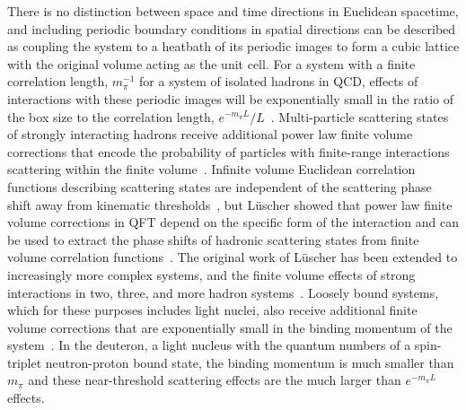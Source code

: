 There is no distinction between space and time directions in Euclidean spacetime, and including periodic boundary conditions in spatial directions can be described as coupling the system to a heatbath of its periodic images to form a cubic lattice with the original volume acting as the unit cell.
For a system with a finite correlation length, $m_{\pi}^{-1}$ for a system of isolated hadrons in QCD, effects of interactions with these periodic images will be exponentially small in the ratio of the box size to the correlation length, $e^{-m_\pi L}/L$~\cite{Luscher:1985dn}.
Multi-particle scattering states of strongly interacting hadrons receive additional power law finite volume corrections that encode the probability of particles with finite-range interactions scattering within the finite volume~\cite{Huang:1957im,Luscher:1986pf}.
Infinite volume Euclidean correlation functions describing scattering states are independent of the scattering phase shift away from kinematic thresholds~\cite{Maiani:1990ca}, but
L{\"u}scher showed that power law finite volume corrections in QFT depend on the specific form of the interaction and can be used to extract the phase shifts of hadronic scattering states from finite volume correlation functions~\cite{Luscher:1986pf}.
The original work of L{\"u}scher has been extended to increasingly more complex systems, and the finite volume effects of strong interactions in two, three, and more hadron systems~\cite{Luscher:1990ux,Luscher:1990ck,Rummukainen:1995vs,Lellouch:2000pv,Beane:2003da,He:2005ey,Kim:2005gf,Christ:2005gi,Lage:2009zv,Luu:2011ep,Briceno:2012yi,Briceno:2012rv,Hansen:2012bj,Hansen:2012tf,Gockeler:2012yj,Briceno:2013bda,Briceno:2013lba,Hansen:2014eka,Briceno:2016xwb,Hansen:2017mnd}.
Loosely bound systems, which for these purposes includes light nuclei, also receive additional finite volume corrections that are exponentially small in the binding momentum of the system~\cite{Beane:2003da}.
In the deuteron, a light nucleus with the quantum numbers of a spin-triplet neutron-proton bound state, the binding momentum is much smaller than $m_\pi$ and these near-threshold scattering effects are the much larger than $e^{-m_\pi L}$ effects.

